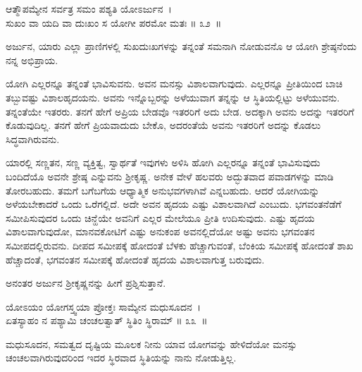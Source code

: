 \begin{shloka}
ಆತ್ಮೌಪಮ್ಯೇನ ಸರ್ವತ್ರ ಸಮಂ ಪಶ್ಯತಿ ಯೋಽರ್ಜುನ~।\\ಸುಖಂ ವಾ ಯದಿ ವಾ ದುಃಖಂ ಸ ಯೋಗೀ ಪರಮೋ ಮತಃ \hfill॥ ೩೨~॥
\end{shloka}

\begin{artha}
ಅರ್ಜುನ, ಯಾರು ಎಲ್ಲಾ ಪ್ರಾಣಿಗಳಲ್ಲಿ ಸುಖದುಃಖಗಳನ್ನು ತನ್ನಂತೆ ಸಮನಾಗಿ ನೋಡುವನೊ ಆ ಯೋಗಿ ಶ್ರೇಷ್ಠನೆಂದು ನನ್ನ ಅಭಿಪ್ರಾಯ.
\end{artha}

ಯೋಗಿ ಎಲ್ಲರನ್ನೂ ತನ್ನಂತೆ ಭಾವಿಸುವನು. ಅವನ ಮನಸ್ಸು ವಿಶಾಲವಾಗುವುದು. ಎಲ್ಲರನ್ನೂ ಪ್ರೀತಿಯಿಂದ ಬಾಚಿ ತಬ್ಬುವಷ್ಟು ವಿಶಾಲಹೃದಯನು. ಅವನು ಇನ್ನೊಬ್ಬರನ್ನು ಅಳೆಯುವಾಗ ತನ್ನನ್ನು ಆ ಸ್ಥಿತಿಯಲ್ಲಿಟ್ಟು ಅಳೆಯುವನು. ತನ್ನಂತೆಯೇ ಇತರರು. ತನಗೆ ಹೇಗೆ ಅಪ್ರಿಯ ಬೇಡವೊ ಇತರರಿಗೆ ಅದು ಬೇಡ. ಅದಕ್ಕಾಗಿ ಅವನು ಅದನ್ನು ಇತರರಿಗೆ ಕೊಡುವುದಿಲ್ಲ. ತನಗೆ ಹೇಗೆ ಪ್ರಿಯವಾದುದು ಬೇಕೊ, ಅದರಂತೆಯೆ ಅವನು ಇತರರಿಗೆ ಅದನ್ನು ಕೊಡಲು ಸಿದ್ಧವಾಗಿರುವನು.

ಯಾರಲ್ಲಿ ಸಣ್ಣತನ, ಸಣ್ಣ ವ್ಯಕ್ತಿತ್ವ, ಸ್ವಾರ್ಥತೆ ಇವುಗಳು ಅಳಿಸಿ ಹೋಗಿ ಎಲ್ಲರನ್ನೂ ತನ್ನಂತೆ ಭಾವಿಸುವುದು ಬಂದಿದೆಯೊ ಅವನೇ ಶ್ರೇಷ್ಠ ಎನ್ನುವನು ಶ‍್ರೀಕೃಷ್ಣ. ಅನೇಕ ವೇಳೆ ಹಲವರು ಅದ್ಭುತವಾದ ಪವಾಡಗಳನ್ನು ಮಾಡಿ ತೋರಬಹುದು. ತಮಗೆ ಬಗೆಬಗೆಯ ಆಧ್ಯಾತ್ಮಿಕ ಅನುಭವಗಳಾಗಿವೆ ಎನ್ನಬಹುದು. ಆದರೆ ಯೋಗಿಯನ್ನು ಅಳೆಯಬೇಕಾದರೆ ಒಂದು ಒರೆಗಲ್ಲಿದೆ. ಅದೇ ಅವನ ಹೃದಯ ಎಷ್ಟು ವಿಶಾಲವಾಗಿದೆ ಎಂಬುದು. ಭಗವಂತನೆಡೆಗೆ ಸಮೀಪಿಸುವುದರ ಒಂದು ಚಿನ್ಹೆಯೇ ಅವನಿಗೆ ಎಲ್ಲರ ಮೇಲೆಯೂ ಪ್ರೀತಿ ಉದಿಸುವುದು. ಎಷ್ಟು ಹೃದಯ ವಿಶಾಲವಾಗುವುದೋ, ಮಾನವಕೋಟಿಗೆ ಎಷ್ಟು ಅನುಕಂಪ ಅವನಲ್ಲಿದೆಯೋ ಅಷ್ಟು ಅವನು ಭಗವಂತನ ಸಮೀಪದಲ್ಲಿರುವನು. ದೀಪದ ಸಮೀಪಕ್ಕೆ ಹೋದಂತೆ ಬೆಳಕು ಹೆಚ್ಚಾಗುವಂತೆ, ಬೆಂಕಿಯ ಸಮೀಪಕ್ಕೆ ಹೋದಂತೆ ಶಾಖ ಹೆಚ್ಚಾದಂತೆ, ಭಗವಂತನ ಸಮೀಪಕ್ಕೆ ಹೋದಂತೆ ಹೃದಯ ವಿಶಾಲವಾಗುತ್ತ ಬರುವುದು.

ಅನಂತರ ಅರ್ಜುನ ಶ‍್ರೀಕೃಷ್ಣನನ್ನು ಹೀಗೆ ಪ್ರಶ್ನಿಸುತ್ತಾನೆ.

\begin{shloka}
ಯೋಽಯಂ ಯೋಗಸ್ತ್ವಯಾ ಪ್ರೋಕ್ತಃ ಸಾಮ್ಯೇನ ಮಧುಸೂದನ~।\\ಏತಸ್ಯಾಹಂ ನ ಪಶ್ಯಾಮಿ ಚಂಚಲತ್ವಾತ್ ಸ್ಥಿತಿಂ ಸ್ಥಿರಾಮ್ \hfill॥ ೩೩~॥
\end{shloka}

\begin{artha}
ಮಧುಸೂದನ, ಸಮತ್ವದ ದೃಷ್ಟಿಯ ಮೂಲಕ ನೀನು ಯಾವ ಯೋಗವನ್ನು ಹೇಳಿದೆಯೋ ಮನಸ್ಸು ಚಂಚಲವಾಗಿರುವುದರಿಂದ ಇದರ ಸ್ಥಿರವಾದ ಸ್ಥಿತಿಯನ್ನು ನಾನು ನೋಡುತ್ತಿಲ್ಲ.
\end{artha}


